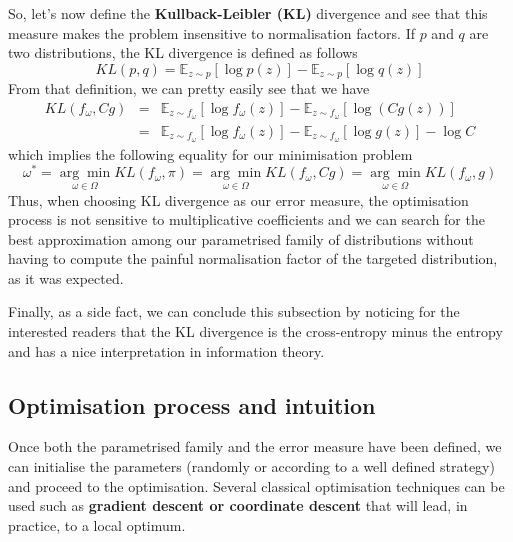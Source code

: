 So, let's now define the \textbf{Kullback-Leibler (KL)} divergence and see that this measure makes the problem insensitive to normalisation factors. If $p$ and $q$ are two distributions, the KL divergence is defined as follows
\begin{equation}K L(p, q)=\mathbb{E}_{z \sim p}[\log p(z)]-\mathbb{E}_{z \sim p}[\log q(z)]\end{equation}
From that definition, we can pretty easily see that we have
\begin{eqnarray}
K L\left(f_{\omega}, C g\right)
&=&\mathbb{E}_{z \sim f_{\omega}}\left[\log f_{\omega}(z)\right]-\mathbb{E}_{z \sim f_{\omega}}[\log (C g(z))]\nonumber\\
&=&\mathbb{E}_{z \sim f_{\omega}}\left[\log f_{\omega}(z)\right]-\mathbb{E}_{z \sim f_{\omega}}[\log g(z)]-\log C
\nonumber
\end{eqnarray}
which implies the following equality for our minimisation problem
\begin{equation}\omega^{*}=\underset{\omega \in \Omega}{\arg \min } K L\left(f_{\omega}, \pi\right)=\underset{\omega \in \Omega}{\arg \min } K L\left(f_{\omega}, C g\right)=\underset{\omega \in \Omega}{\arg \min } K L\left(f_{\omega}, g\right)\end{equation}
Thus, when choosing KL divergence as our error measure, the optimisation process is not sensitive to multiplicative coefficients and we can search for the best approximation among our parametrised family of distributions without having to compute the painful normalisation factor of the targeted distribution, as it was expected.

Finally, as a side fact, we can conclude this subsection by noticing for the interested readers that the KL divergence is the cross-entropy minus the entropy and has a nice interpretation in information theory.

\subsection{Optimisation process and intuition}

Once both the parametrised family and the error measure have been defined, we can initialise the parameters (randomly or according to a well defined strategy) and proceed to the optimisation. Several classical optimisation techniques can be used such as \textbf{gradient descent or coordinate descent} that will lead, in practice, to a local optimum.

